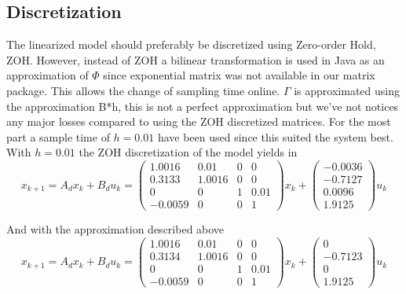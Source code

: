 \documentclass[10pt,a4paper]{article}
\begin{document}
\subsection{Discretization}
The linearized model should preferably be discretized using Zero-order Hold, ZOH. However, instead of ZOH a bilinear transformation is used in Java as an approximation of $\Phi$ since exponential matrix was not available in our matrix package. This allows the change of sampling time online. $ \Gamma $ is approximated using the approximation B*h, this is not a perfect approximation but we've not notices any major losses compared to using the ZOH discretized matrices. For the most part a sample time of $h=0.01$ have been used since this suited the system best. With $h=0.01$ the ZOH discretization of the model yields in 
\begin{equation}
x_{k+1} = A_dx_k + B_du_k =\begin{pmatrix}
 1.0016 & 0.01 & 0 & 0 \\
 0.3133 & 1.0016 & 0 & 0 \\
 0 & 0 & 1 & 0.01 \\
 -0.0059 & 0 & 0 & 1 
\end{pmatrix}x_k + \begin{pmatrix}
-0.0036\\
-0.7127\\
 0.0096\\
 1.9125
 \end{pmatrix}u_k
\end{equation}

And with the approximation described above
\begin{equation}
x_{k+1} = A_dx_k + B_du_k =\begin{pmatrix}
1.0016 & 0.01 & 0 & 0 \\
0.3134 & 1.0016 & 0 & 0 \\
0 & 0 & 1 & 0.01 \\
-0.0059 & 0 & 0 & 1
\end{pmatrix}x_k + \begin{pmatrix}
0\\
-0.7123\\
 0\\
 1.9125
 \end{pmatrix}u_k
 \label{eq:discrete}
\end{equation}
\end{document}
